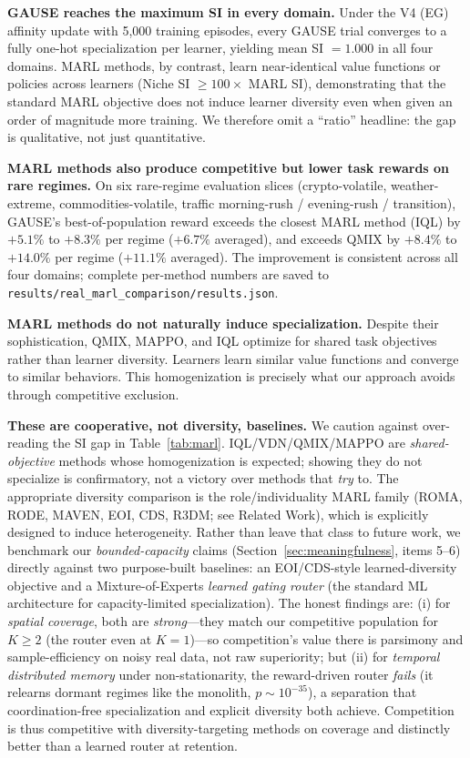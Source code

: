 \documentclass{article}
\begin{document}
\textbf{GAUSE reaches the maximum SI in every domain.} Under the V4 (EG) affinity update with 5{,}000 training episodes, every GAUSE trial converges to a fully one-hot specialization per learner, yielding mean SI $= 1.000$ in all four domains. MARL methods, by contrast, learn near-identical value functions or policies across learners (Niche SI $\geq 100\times$ MARL SI), demonstrating that the standard MARL objective does not induce learner diversity even when given an order of magnitude more training. We therefore omit a ``ratio'' headline: the gap is qualitative, not just quantitative.

\textbf{MARL methods also produce competitive but lower task rewards on rare regimes.} On six rare-regime evaluation slices (crypto-volatile, weather-extreme, commodities-volatile, traffic morning-rush / evening-rush / transition), GAUSE's best-of-population reward exceeds the closest MARL method (IQL) by $+5.1\%$ to $+8.3\%$ per regime ($+6.7\%$ averaged), and exceeds QMIX by $+8.4\%$ to $+14.0\%$ per regime ($+11.1\%$ averaged). The improvement is consistent across all four domains; complete per-method numbers are saved to \texttt{results/real\_marl\_comparison/results.json}.

\textbf{MARL methods do not naturally induce specialization.} Despite their sophistication, QMIX, MAPPO, and IQL optimize for shared task objectives rather than learner diversity. Learners learn similar value functions and converge to similar behaviors. This homogenization is precisely what our approach avoids through competitive exclusion.

\textbf{These are cooperative, not diversity, baselines.} We caution against over-reading the SI gap in Table~\ref{tab:marl}. IQL/VDN/QMIX/MAPPO are \emph{shared-objective} methods whose homogenization is expected; showing they do not specialize is confirmatory, not a victory over methods that \emph{try} to. The appropriate diversity comparison is the role/individuality MARL family (ROMA, RODE, MAVEN, EOI, CDS, R3DM; see Related Work), which is explicitly designed to induce heterogeneity. Rather than leave that class to future work, we benchmark our \emph{bounded-capacity} claims (Section~\ref{sec:meaningfulness}, items 5--6) directly against two purpose-built baselines: an EOI/CDS-style learned-diversity objective and a Mixture-of-Experts \emph{learned gating router} (the standard ML architecture for capacity-limited specialization). The honest findings are: (i) for \emph{spatial coverage}, both are \emph{strong}---they match our competitive population for $K\geq2$ (the router even at $K{=}1$)---so competition's value there is parsimony and sample-efficiency on noisy real data, not raw superiority; but (ii) for \emph{temporal distributed memory} under non-stationarity, the reward-driven router \emph{fails} (it relearns dormant regimes like the monolith, $p\sim10^{-35}$), a separation that coordination-free specialization and explicit diversity both achieve. Competition is thus competitive with diversity-targeting methods on coverage and distinctly better than a learned router at retention.
\end{document}

